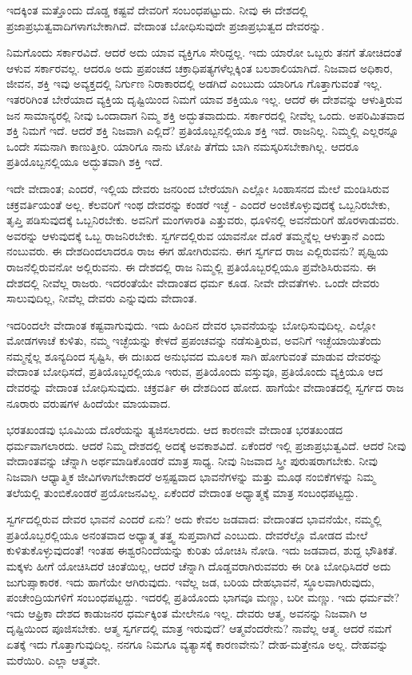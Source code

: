 ಇದಕ್ಕಿಂತ ಮತ್ತೊಂದು ದೊಡ್ಡ ಕಷ್ಟವೆ ದೇವರಿಗೆ ಸಂಬಂಧಪಟ್ಟುದು. ನೀವು ಈ ದೇಶದಲ್ಲಿ ಪ್ರಜಾಪ್ರಭುತ್ವವಾದಿಗಳಾಗಬೇಕಾಗಿದೆ. ವೇದಾಂತ ಬೋಧಿಸುವುದೇ ಪ್ರಜಾಪ್ರಭುತ್ವದ ದೇವರನ್ನು.

ನಿಮಗೊಂದು ಸರ್ಕಾರವಿದೆ. ಆದರೆ ಅದು ಯಾವ ವ್ಯಕ್ತಿಗೂ ಸೇರಿದ್ದಲ್ಲ. ಇದು ಯಾರೋ ಒಬ್ಬರು ತನಗೆ ತೋಚಿದಂತೆ ಆಳುವ ಸರ್ಕಾರವಲ್ಲ. ಆದರೂ ಅದು ಪ್ರಪಂಚದ ಚಕ್ರಾಧಿಪತ್ಯಗಳೆಲ್ಲಕ್ಕಿಂತ ಬಲಶಾಲಿಯಾಗಿದೆ. ನಿಜವಾದ ಅಧಿಕಾರ, ಜೀವನ, ಶಕ್ತಿ ಇವು ಅವ್ಯಕ್ತದಲ್ಲಿ ನಿರ್ಗುಣ ನಿರಾಕಾರದಲ್ಲಿ ಅಡಗಿದೆ ಎಂಬುದು ಯಾರಿಗೂ ಗೊತ್ತಾಗುವಂತೆ ಇಲ್ಲ. ಇತರರಿಗಿಂತ ಬೇರೆಯಾದ ವ್ಯಕ್ತಿಯ ದೃಷ್ಟಿಯಿಂದ ನಿಮಗೆ ಯಾವ ಶಕ್ತಿಯೂ ಇಲ್ಲ. ಆದರೆ ಈ ದೇಶವನ್ನು ಆಳುತ್ತಿರುವ ಜನ ಸಾಮಾನ್ಯರಲ್ಲಿ ನೀವು ಒಂದಾದಾಗ ನಿಮ್ಮ ಶಕ್ತಿ ಅದ್ಭುತವಾದುದು. ಸರ್ಕಾರದಲ್ಲಿ ನೀವೆಲ್ಲ ಒಂದು. ಅಪರಿಮಿತವಾದ ಶಕ್ತಿ ನಿಮಗೆ ಇದೆ. ಆದರೆ ಶಕ್ತಿ ನಿಜವಾಗಿ ಎಲ್ಲಿದೆ? ಪ್ರತಿಯೊಬ್ಬನಲ್ಲಿಯೂ ಶಕ್ತಿ ಇದೆ. ರಾಜನಿಲ್ಲ. ನಿಮ್ಮಲ್ಲಿ ಎಲ್ಲರನ್ನೂ ಒಂದೇ ಸಮನಾಗಿ ಕಾಣುತ್ತೀರಿ. ಯಾರಿಗೂ ನಾನು ಟೋಪಿ ತೆಗೆದು ಬಾಗಿ ನಮಸ್ಕರಿಸಬೇಕಾಗಿಲ್ಲ. ಆದರೂ ಪ್ರತಿಯೊಬ್ಬನಲ್ಲಿಯೂ ಅದ್ಭುತವಾಗಿ ಶಕ್ತಿ ಇದೆ.

ಇದೇ ವೇದಾಂತ; ಎಂದರೆ, ಇಲ್ಲಿಯ ದೇವರು ಜನರಿಂದ ಬೇರೆಯಾಗಿ ಎಲ್ಲೋ ಸಿಂಹಾಸನದ ಮೇಲೆ ಮಂಡಿಸಿರುವ ಚಕ್ರವರ್ತಿಯಂತೆ ಅಲ್ಲ. ಕೆಲವರಿಗೆ ಇಂಥ ದೇವರನ್ನು ಕಂಡರೆ ಇಚ್ಛೆ - ಎಂದರೆ ಅಂಜಿಕೊಳ್ಳುವುದಕ್ಕೆ ಒಬ್ಬನಿರಬೇಕು, ತೃಪ್ತಿ ಪಡಿಸುವುದಕ್ಕೆ ಒಬ್ಬನಿರಬೇಕು. ಅವನಿಗೆ ಮಂಗಳಾರತಿ ಎತ್ತುವರು, ಧೂಳಿನಲ್ಲಿ ಅವನೆದುರಿಗೆ ಹೊರಳಾಡುವರು. ಅವರನ್ನು ಆಳುವುದಕ್ಕೆ ಒಬ್ಬ ರಾಜನಿರಬೇಕು. ಸ್ವರ್ಗದಲ್ಲಿರುವ ಯಾವನೋ ದೊರೆ ತಮ್ಮನ್ನೆಲ್ಲ ಆಳುತ್ತಾನೆ ಎಂದು ನಂಬುವರು. ಈ ದೇಶದಿಂದಲಾದರೂ ರಾಜ ಈಗ ಹೋಗಿರುವನು. ಈಗ ಸ್ವರ್ಗದ ರಾಜ ಎಲ್ಲಿರುವನು? ಪೃಥ್ವಿಯ ರಾಜನೆಲ್ಲಿರುವನೋ ಅಲ್ಲಿರುವನು. ಈ ದೇಶದಲ್ಲಿ ರಾಜ ನಿಮ್ಮಲ್ಲಿ ಪ್ರತಿಯೊಬ್ಬರಲ್ಲಿಯೂ ಪ್ರವೇಶಿಸಿರುವನು. ಈ ದೇಶದಲ್ಲಿ ನೀವೆಲ್ಲ ರಾಜರು. ಇದರಂತೆಯೇ ವೇದಾಂತದ ಧರ್ಮ ಕೂಡ. ನೀವೇ ದೇವತೆಗಳು. ಒಂದೇ ದೇವರು ಸಾಲುವುದಿಲ್ಲ, ನೀವೆಲ್ಲ ದೇವರು ಎನ್ನುವುದು ವೇದಾಂತ.

ಇದರಿಂದಲೇ ವೇದಾಂತ ಕಷ್ಟವಾಗುವುದು. ಇದು ಹಿಂದಿನ ದೇವರ ಭಾವನೆಯನ್ನು ಬೋಧಿಸುವುದಿಲ್ಲ. ಎಲ್ಲೋ ಮೋಡಗಳಾಚೆ ಕುಳಿತು, ನಮ್ಮ ಇಚ್ಛೆಯನ್ನು ಕೇಳದೆ ಪ್ರಪಂಚವನ್ನು ನಡೆಸುತ್ತಿರುವ, ಅವನಿಗೆ ಇಚ್ಛೆಯಾಯಿತೆಂದು ನಮ್ಮನ್ನೆಲ್ಲ ಶೂನ್ಯದಿಂದ ಸೃಷ್ಟಿಸಿ, ಈ ದುಃಖದ ಅನುಭವದ ಮೂಲಕ ಸಾಗಿ ಹೋಗುವಂತೆ ಮಾಡುವ ದೇವರನ್ನು ವೇದಾಂತ ಬೋಧಿಸದೆ, ಪ್ರತಿಯೊಬ್ಬರಲ್ಲಿಯೂ ಇರುವ, ಪ್ರತಿಯೊಂದು ವಸ್ತುವೂ, ಪ್ರತಿಯೊಂದು ವ್ಯಕ್ತಿಯೂ ಆದ ದೇವರನ್ನು ವೇದಾಂತ ಬೋಧಿಸುವುದು. ಚಕ್ರವರ್ತಿ ಈ ದೇಶದಿಂದ ಹೋದ. ಹಾಗೆಯೇ ವೇದಾಂತದಲ್ಲಿ ಸ್ವರ್ಗದ ರಾಜ ನೂರಾರು ವರುಷಗಳ ಹಿಂದೆಯೇ ಮಾಯವಾದ.

ಭರತಖಂಡವು ಭೂಮಿಯ ದೊರೆಯನ್ನು ತ್ಯಜಿಸಲಾರದು. ಆದ ಕಾರಣವೇ ವೇದಾಂತ ಭರತಖಂಡದ ಧರ್ಮವಾಗಲಾರದು. ಆದರೆ ನಿಮ್ಮ ದೇಶದಲ್ಲಿ ಅದಕ್ಕೆ ಅವಕಾಶವಿದೆ. ಏಕೆಂದರೆ ಇಲ್ಲಿ ಪ್ರಜಾಪ್ರಭುತ್ವವಿದೆ. ಆದರೆ ನೀವು ವೇದಾಂತವನ್ನು ಚೆನ್ನಾಗಿ ಅರ್ಥಮಾಡಿಕೊಂಡರೆ ಮಾತ್ರ ಸಾಧ್ಯ. ನೀವು ನಿಜವಾದ ಸ್ತ್ರೀ ಪುರುಷರಾಗಬೇಕು. ನೀವು ನಿಜವಾಗಿ ಆಧ್ಯಾತ್ಮಿಕ ಜೀವಿಗಳಾಗಬೇಕಾದರೆ ಅಸ್ಪಷ್ಟವಾದ ಭಾವನೆಗಳನ್ನು ಮತ್ತು ಮೂಢ ನಂಬಿಕೆಗಳನ್ನು ನಿಮ್ಮ ತಲೆಯಲ್ಲಿ ತುಂಬಿಕೊಂಡರೆ ಪ್ರಯೋಜನವಿಲ್ಲ. ಏಕೆಂದರೆ ವೇದಾಂತ ಅಧ್ಯಾತ್ಮಕ್ಕೆ ಮಾತ್ರ ಸಂಬಂಧಪಟ್ಟದ್ದು.

ಸ್ವರ್ಗದಲ್ಲಿರುವ ದೇವರ ಭಾವನೆ ಎಂದರೆ ಏನು? ಅದು ಕೇವಲ ಜಡವಾದ: ವೇದಾಂತದ ಭಾವನೆಯೇ, ನಮ್ಮಲ್ಲಿ ಪ್ರತಿಯೊಬ್ಬರಲ್ಲಿಯೂ ಅನಂತವಾದ ಅಧ್ಯಾತ್ಮ ತತ್ತ್ವ ಸುಪ್ತವಾಗಿದೆ ಎಂಬುದು. ದೇವರೆಲ್ಲೊ ಮೋಡದ ಮೇಲೆ ಕುಳಿತುಕೊಳ್ಳುವುದಂತೆ! ಇಂತಹ ಈಶ್ವರನಿಂದೆಯನ್ನು ಕುರಿತು ಯೋಚಿಸಿ ನೋಡಿ. ಇದು ಜಡವಾದ, ಶುದ್ದ ಭೌತಿಕತೆ. ಮಕ್ಕಳು ಹೀಗೆ ಯೋಚಿಸಿದರೆ ಚಿಂತೆಯಿಲ್ಲ, ಆದರೆ ಚೆನ್ನಾಗಿ ದೊಡ್ಡವರಾಗಿರುವವರು ಈ ರೀತಿ ಬೋಧಿಸಿದರೆ ಅದು ಜುಗುಪ್ಸಾಕಾರಕ. ಇದು ಹಾಗೆಯೇ ಆಗಿರುವುದು. ಇವೆಲ್ಲ ಜಡ, ಬರಿಯ ದೇಹಭಾವನೆ, ಸ್ಥೂಲವಾಗಿರುವುದು, ಪಂಚೇಂದ್ರಿಯಗಳಿಗೆ ಸಂಬಂಧಪಟ್ಟದ್ದು. ಇದರಲ್ಲಿ ಪ್ರತಿಯೊಂದು ಭಾಗವೂ ಮಣ್ಣು, ಬರೀ ಮಣ್ಣು. ಇದು ಧರ್ಮವೇ? ಇದು ಆಫ್ರಿಕಾ ದೇಶದ ಕಾಡುಜನರ ಧರ್ಮಕ್ಕಿಂತ ಮೇಲೇನೂ ಇಲ್ಲ. ದೇವರು ಆತ್ಮ, ಅವನನ್ನು ನಿಜವಾಗಿ ಆ ದೃಷ್ಟಿಯಿಂದ ಪೂಜಿಸಬೇಕು. ಆತ್ಮ ಸ್ವರ್ಗದಲ್ಲಿ ಮಾತ್ರ ಇರುವುದೆ? ಆತ್ಮವೆಂದರೇನು? ನಾವೆಲ್ಲ ಆತ್ಮ. ಆದರೆ ನಮಗೆ ಏತಕ್ಕೆ ಇದು ಗೊತ್ತಾಗುವುದಿಲ್ಲ. ನನಗೂ ನಿಮಗೂ ವ್ಯತ್ಯಾಸಕ್ಕೆ ಕಾರಣವೇನು? ದೇಹ-ಮತ್ತೇನೂ ಅಲ್ಲ. ದೇಹವನ್ನು ಮರೆಯಿರಿ. ಎಲ್ಲಾ ಆತ್ಮವೇ.

